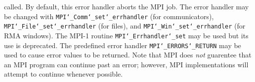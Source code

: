 called.  By default, this error handler aborts the MPI job.  The error handler
may be changed with {\tt MPI{\tt \char`\_}Comm{\tt \char`\_}set{\tt \char`\_}errhandler} (for communicators),
{\tt MPI{\tt \char`\_}File{\tt \char`\_}set{\tt \char`\_}errhandler} (for files), and {\tt MPI{\tt \char`\_}Win{\tt \char`\_}set{\tt \char`\_}errhandler} (for
RMA windows).  The MPI-1 routine {\tt MPI{\tt \char`\_}Errhandler{\tt \char`\_}set} may be used but
its use is deprecated.  The predefined error handler
{\tt MPI{\tt \char`\_}ERRORS{\tt \char`\_}RETURN} may be used to cause error values to be returned.
Note that MPI does {\em not} guarentee that an MPI program can continue past
an error; however, MPI implementations will attempt to continue whenever
possible.
\par
{}
\endmanpage
